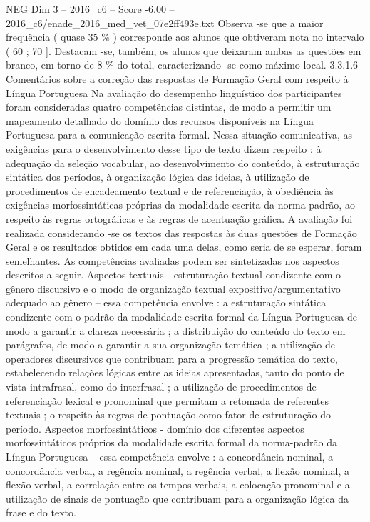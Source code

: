 \begin{textsample}{NEG Dim 3 – 2016\_c6 – Score -6.00 – 2016\_c6/enade\_2016\_med\_vet\_07e2ff493e.txt}
Observa -se que a maior frequência ( quase 35 \% ) corresponde aos alunos que obtiveram nota no intervalo ( 60 ; 70 ].
Destacam -se, também, os alunos que deixaram ambas as questões em branco, em torno de 8 \% do total, caracterizando -se como máximo local. 3.3.1.6 - Comentários sobre a correção das respostas de Formação Geral com respeito à Língua Portuguesa Na avaliação do desempenho linguístico dos participantes foram consideradas quatro competências distintas, de modo a permitir um mapeamento detalhado do domínio dos recursos disponíveis na Língua Portuguesa para a comunicação escrita formal.
Nessa situação comunicativa, as exigências para o desenvolvimento desse tipo de texto dizem respeito : à adequação da seleção vocabular, ao desenvolvimento do conteúdo, à estruturação sintática dos períodos, à organização lógica das ideias, à utilização de procedimentos de encadeamento textual e de referenciação, à obediência às exigências morfossintáticas próprias da modalidade escrita da norma-padrão, ao respeito às regras ortográficas e às regras de acentuação gráfica.
A avaliação foi realizada considerando -se os textos das respostas às duas questões de Formação Geral e os resultados obtidos em cada uma delas, como seria de se esperar, foram semelhantes.
As competências avaliadas podem ser sintetizadas nos aspectos descritos a seguir.
Aspectos textuais - estruturação textual condizente com o gênero discursivo e o modo de organização textual expositivo/argumentativo adequado ao gênero – essa competência envolve : a estruturação sintática condizente com o padrão da modalidade escrita formal da Língua Portuguesa de modo a garantir a clareza necessária ; a distribuição do conteúdo do texto em parágrafos, de modo a garantir a sua organização temática ; a utilização de operadores discursivos que contribuam para a progressão temática do texto, estabelecendo relações lógicas entre as ideias apresentadas, tanto do ponto de vista intrafrasal, como do interfrasal ; a utilização de procedimentos de referenciação lexical e pronominal que permitam a retomada de referentes textuais ; o respeito às regras de pontuação como fator de estruturação do período.
Aspectos morfossintáticos - domínio dos diferentes aspectos morfossintáticos próprios da modalidade escrita formal da norma-padrão da Língua Portuguesa – essa competência envolve : a concordância nominal, a concordância verbal, a regência nominal, a regência verbal, a flexão nominal, a flexão verbal, a correlação entre os tempos verbais, a colocação pronominal e a utilização de sinais de pontuação que contribuam para a organização lógica da frase e do texto.

\end{textsample}
